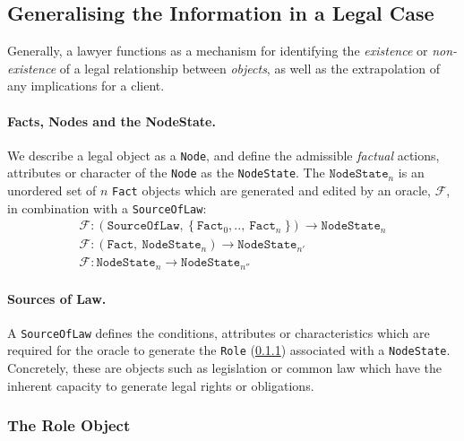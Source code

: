 \documentclass{article}
\numberwithin{equation}{section}
\begin{document}

\subsection{Generalising the Information in a Legal Case}

Generally, a lawyer functions as a mechanism for identifying the \textit{existence} or \textit{non-existence} of a legal relationship between \textit{objects}, as well as the extrapolation of any implications for a client. 

\paragraph{Facts, Nodes and the NodeState.} We describe a legal object as a \texttt{Node}, and define the admissible \textit{factual} actions, attributes or character of the \texttt{Node} as the \texttt{NodeState}. The $\texttt{NodeState}_n$ is an unordered set of $n$  \texttt{Fact} objects which are generated and edited by an oracle, $\mathcal{F}$, in combination with a \texttt{SourceOfLaw}: %
\begin{align}
	\mathcal{F}: (\texttt{SourceOfLaw}, \ \{ \ \texttt{Fact}_0, .., \ \texttt{Fact}_n \ \}) \rightarrow \texttt{NodeState}_n \\
	\mathcal{F}: (\texttt{Fact}, \ \texttt{NodeState}_n) \rightarrow \texttt{NodeState}_{n'} \\
	\mathcal{F}: \texttt{NodeState}_n \rightarrow \texttt{NodeState}_{n''}
\end{align}

\paragraph{Sources of Law.} A \texttt{SourceOfLaw} defines the conditions, attributes or characteristics which are required for the oracle to generate the \texttt{Role} (\ref{section:role-object})  associated with a \texttt{NodeState}. Concretely, these are objects such as legislation or common law which have the inherent capacity to generate legal rights or obligations.


\subsubsection{The Role Object} \label{section:role-object}
\end{document}
